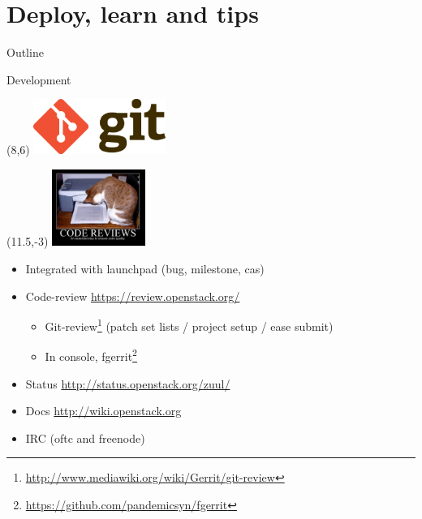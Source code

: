 
\section{Deploy, learn and tips}
\begin{frame}{Outline}
\end{frame}

\begin{frame}{Development}
  \begin{textblock}{}(8,6)
    \includegraphics[height=1.8cm]{img/logo-git.png}
  \end{textblock}
  \begin{textblock}{}(11.5,-3)
    \includegraphics[height=2.5cm]{img/cat_review.jpg}
  \end{textblock}
  \begin{itemize}
    \item Integrated with launchpad (bug, milestone, cas)
    \item Code-review \url{https://review.openstack.org/}
      \begin{itemize}
        \item Git-review\footnote{\url{http://www.mediawiki.org/wiki/Gerrit/git-review}} (patch set lists / project setup / ease submit)
        \item In console, fgerrit\footnote{\url{https://github.com/pandemicsyn/fgerrit}}
      \end{itemize}
    \item Status \url{http://status.openstack.org/zuul/}
    \item Docs \url{http://wiki.openstack.org}
    \item IRC (oftc and freenode)
  \end{itemize}
\end{frame}

